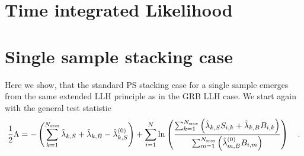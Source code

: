 
\section{Time integrated Likelihood}

\section{Single sample stacking case}
Here we show, that the standard PS stacking case for a single sample emerges from the same extended LLH principle as in the GRB LLH case.
We start again with the general test statistic
\begin{equation}
  \frac{1}{2}\Lambda
  = -\left(\sum_{k=1}^{N_\text{srcs}}\hat{\lambda}_{k,S} +
                                      \hat{\lambda}_{k,B} -
                                      \hat{\lambda}_{k,S}^{(0)}\right) +
    \sum_{i=1}^N \ln\left(
      \frac{\sum_{k=1}^{N_\text{srcs}}\left(
          \hat{\lambda}_{k,S} S_{i,k}+\hat{\lambda}_{k,B} B_{i,k}\right)}
          {\sum_{m=1}^{N_\text{srcs}}\left(
            \hat{\lambda}_{m,B}^{(0)} B_{i,m}
          \right)}
        \right)
  \quad\text{.}
\end{equation}


